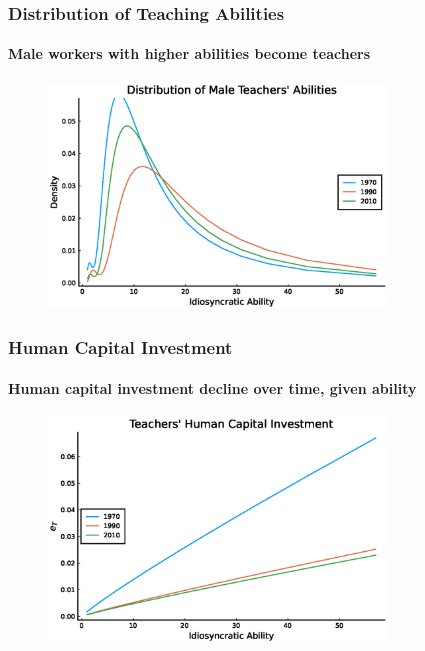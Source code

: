 \documentclass[11pt]{beamer}
\begin{document}
\begin{frame}
\frametitle{Distribution of Teaching Abilities}
\framesubtitle{Male workers with higher abilities become teachers}
\begin{figure}
 		\begin{center}
\includegraphics[width=0.8\textwidth]{plots/counterfactuals/counter_1/fT_men_steadystate.eps}
 			\label{ }
 		\end{center}
 	\end{figure}
\end{frame}


\begin{frame}
\frametitle{Human Capital Investment}
\framesubtitle{Human capital investment decline over time, given ability}
\begin{figure}
 		\begin{center}
 			\includegraphics[width=0.8\textwidth]{plots/counterfactuals/counter_1/eT_steadystate.eps}
 			\label{ }
 		\end{center}
 	\end{figure}
\end{frame}
\end{document}
